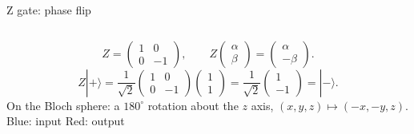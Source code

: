 \begin{frame}{Z gate: phase flip}
  \begin{columns}[c]
    \[
      Z=\begin{pmatrix}1&0\\0&-1\end{pmatrix},\qquad
      Z\begin{pmatrix}\alpha\\\beta\end{pmatrix}
       =\begin{pmatrix}\alpha\\-\beta\end{pmatrix}.
    \]
    \[
      Z|+\rangle=\frac{1}{\sqrt2}
      \begin{pmatrix}1&0\\0&-1\end{pmatrix}
      \begin{pmatrix}1\\1\end{pmatrix}
      =\frac{1}{\sqrt2}\begin{pmatrix}1\\-1\end{pmatrix}=|-\rangle.
    \]
    On the Bloch sphere: a $180^\circ$ rotation about the $z$ axis,
    $(x,y,z)\mapsto(-x,-y,z)$.
    \centering{}
    \small Blue: input \quad Red: output
  \end{columns}
\end{frame}
